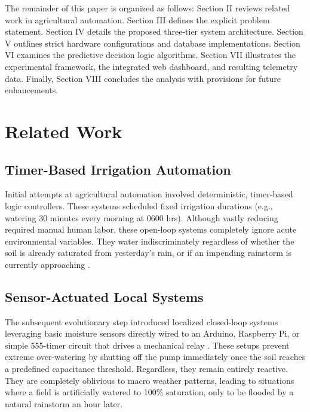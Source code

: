 \documentclass[conference]{IEEEtran}
\begin{document}
The remainder of this paper is organized as follows: Section II reviews related work in agricultural automation. Section III defines the explicit problem statement. Section IV details the proposed three-tier system architecture. Section V outlines strict hardware configurations and database implementations. Section VI examines the predictive decision logic algorithms. Section VII illustrates the experimental framework, the integrated web dashboard, and resulting telemetry data. Finally, Section VIII concludes the analysis with provisions for future enhancements.

\section{Related Work}

\subsection{Timer-Based Irrigation Automation}
Initial attempts at agricultural automation involved deterministic, timer-based logic controllers. These systems scheduled fixed irrigation durations (e.g., watering 30 minutes every morning at 0600 hrs). Although vastly reducing required manual human labor, these open-loop systems completely ignore acute environmental variables. They water indiscriminately regardless of whether the soil is already saturated from yesterday's rain, or if an impending rainstorm is currently approaching \cite{b5}. 

\subsection{Sensor-Actuated Local Systems}
The subsequent evolutionary step introduced localized closed-loop systems leveraging basic moisture sensors directly wired to an Arduino, Raspberry Pi, or simple 555-timer circuit that drives a mechanical relay \cite{b6}. These setups prevent extreme over-watering by shutting off the pump immediately once the soil reaches a predefined capacitance threshold. Regardless, they remain entirely reactive. They are completely oblivious to macro weather patterns, leading to situations where a field is artificially watered to 100\% saturation, only to be flooded by a natural rainstorm an hour later.
\end{document}
